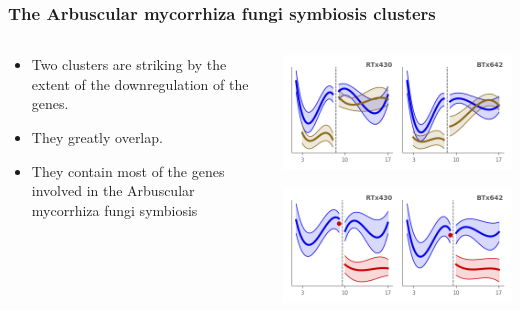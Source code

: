 \documentclass[xcolor=dvipsnames]{beamer}
\begin{document}
\begin{frame}
\frametitle{The Arbuscular mycorrhiza fungi symbiosis clusters}
\begin{columns}
\begin{column}{0.6\linewidth}
\begin{itemize}[label={$\bullet$}]
\item Two clusters are striking by the extent of the downregulation of the
genes.
\item They greatly overlap.
\item They contain most of the genes involved in the Arbuscular mycorrhiza fungi symbiosis 
\end{itemize}
\end{column}
\begin{column}{0.4\linewidth}
\includegraphics[width=0.9\linewidth]{figures/clusters/root_Preflowering_18.png}

\includegraphics[width=0.9\linewidth]{figures/clusters/root_Postflowering_1.png}
\end{column}
\end{columns}
\end{frame}
\end{document}
